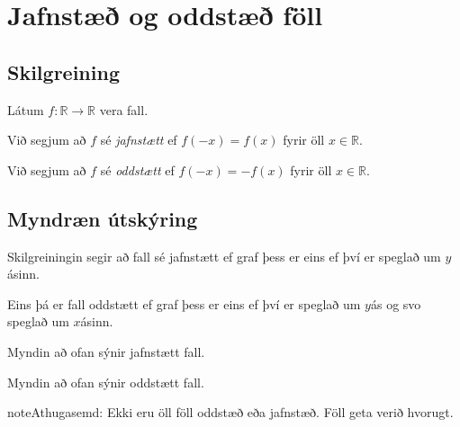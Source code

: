 \documentclass[a4paper,10pt,icelandic]{sphinxmanual}
\begin{document}
\section{Jafnstæð og oddstæð föll}
\label{\detokenize{Kafli05:jafnstae-og-oddstae-foll}}

\subsection{Skilgreining}
\label{\detokenize{Kafli05:skilgreining}}
Látum \(f: \mathbb{R} \to \mathbb{R}\) vera fall.

Við segjum að \(f\) sé \textit{jafnstætt} ef \(f(-x)=f(x)\) fyrir öll \(x \in \mathbb{R}\).

Við segjum að \(f\) sé \textit{oddstætt} ef \(f(-x)=-f(x)\) fyrir öll \(x \in \mathbb{R}\).


\subsection{Myndræn útskýring}
\label{\detokenize{Kafli05:myndraen-utskyring}}
Skilgreiningin segir að fall sé jafnstætt ef graf þess er eins ef því er speglað um \(y\)\sphinxhyphen{}ásinn.

Eins þá er fall oddstætt ef graf þess er eins ef því er speglað um \(y\)\sphinxhyphen{}ás og svo speglað um \(x\)\sphinxhyphen{}ásinn.


Myndin að ofan sýnir jafnstætt fall.


Myndin að ofan sýnir oddstætt fall.

\begin{sphinxadmonition}{note}{Athugasemd:}
Ekki eru öll föll oddstæð eða jafnstæð. Föll geta verið hvorugt.
\end{sphinxadmonition}
\end{document}

